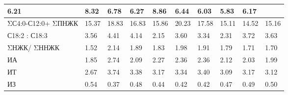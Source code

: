 \begin{table}[H]
{\begin{tabular}{|l|lll|lll|lll|}
    \multicolumn{1}{l|}{6.21} &
    \multicolumn{1}{l|}{8.32} &
    6.78 &
    \multicolumn{1}{l|}{6.27} &
    \multicolumn{1}{l|}{8.86} &
    6.44 &
    \multicolumn{1}{l|}{6.03} &
    \multicolumn{1}{l|}{5.83} &
    6.17 \\ \hline
  ΣС4:0-С12:0+   ΣПНЖК &
    \multicolumn{1}{l|}{15.37} &
    \multicolumn{1}{l|}{18.83} &
    16.83 &
    \multicolumn{1}{l|}{15.86} &
    \multicolumn{1}{l|}{20.23} &
    17.58 &
    \multicolumn{1}{l|}{15.11} &
    \multicolumn{1}{l|}{14.52} &
    15.16 \\ \hline
  С18:2 : С18:3 &
    \multicolumn{1}{l|}{3.56} &
    \multicolumn{1}{l|}{4.41} &
    4.14 &
    \multicolumn{1}{l|}{2.15} &
    \multicolumn{1}{l|}{3.60} &
    3.34 &
    \multicolumn{1}{l|}{2.31} &
    \multicolumn{1}{l|}{3.72} &
    3.63 \\ \hline
  ΣНЖК/ ΣННЖК &
    \multicolumn{1}{l|}{1.52} &
    \multicolumn{1}{l|}{2.14} &
    1.89 &
    \multicolumn{1}{l|}{1.83} &
    \multicolumn{1}{l|}{1.98} &
    1.91 &
    \multicolumn{1}{l|}{1.79} &
    \multicolumn{1}{l|}{1.71} &
    1.70 \\ \hline
  ИА &
    \multicolumn{1}{l|}{1.85} &
    \multicolumn{1}{l|}{2.74} &
    2.09 &
    \multicolumn{1}{l|}{2.27} &
    \multicolumn{1}{l|}{2.36} &
    2.36 &
    \multicolumn{1}{l|}{2.12} &
    \multicolumn{1}{l|}{2.03} &
    1.99 \\ \hline
  ИТ &
    \multicolumn{1}{l|}{2.67} &
    \multicolumn{1}{l|}{3.74} &
    3.38 &
    \multicolumn{1}{l|}{3.17} &
    \multicolumn{1}{l|}{3.34} &
    3.40 &
    \multicolumn{1}{l|}{3.09} &
    \multicolumn{1}{l|}{3.17} &
    3.12 \\ \hline
  ИЗ &
    \multicolumn{1}{l|}{0.54} &
    \multicolumn{1}{l|}{0.37} &
    0.48 &
    \multicolumn{1}{l|}{0.44} &
    \multicolumn{1}{l|}{0.42} &
    0.42 &
    \multicolumn{1}{l|}{0.47} &
    \multicolumn{1}{l|}{0.49} &
    0.50 \\ \hline
  \end{tabular}%
  }
\end{table}


